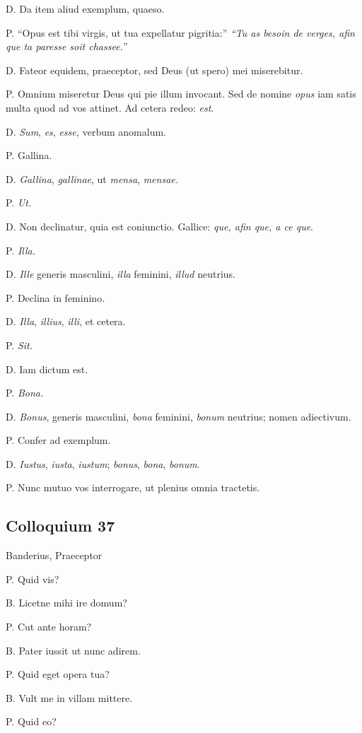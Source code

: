 \documentclass{article}
\begin{document}
D. Da item aliud exemplum, quaeso.

P. ``Opus est tibi virgis, ut tua expellatur pigritia:'' \emph{``Tu as besoin de verges, afin que ta paresse soit chassee.''}

D. Fateor equidem, praeceptor, sed Deus (ut spero) mei miserebitur.

P. Omnium miseretur Deus qui pie illum invocant. Sed de nomine \emph{opus} iam satis multa quod ad vos attinet. Ad cetera redeo: \emph{est}.

D. \emph{Sum}, \emph{es}, \emph{esse,} verbum anomalum.

P. {Gallina.}

D. \emph{Gallina}, \emph{gallinae}, ut \emph{mensa}, \emph{mensae.}

P. \emph{Ut.}

D. Non declinatur, quia est coniunctio. Gallice: \emph{que, afin que, a ce que}.

P. \emph{Illa.}

D. \emph{Ille} generis masculini, \emph{illa} feminini, \emph{illud} neutrius.

P. Declina in feminino.

D. \emph{Illa}, \emph{illius}, \emph{illi}, et cetera.

P. \emph{Sit.}

D. Iam dictum est.

P. \emph{Bona.}

D. \emph{Bonus}, generis masculini, \emph{bona} feminini, \emph{bonum} neutrius; nomen adiectivum.

P. Confer ad exemplum.

D. \emph{Iustus}, \emph{iusta}, \emph{iustum}; \emph{bonus}, \emph{bona}, \emph{bonum}.

P. Nunc mutuo vos interrogare, ut plenius omnia tractetis.

\subsection{Colloquium 37}
Banderius, Praeceptor

P. Quid vis?

B. Licetne mihi ire domum?

P. Cut ante horam?

B. Pater iussit ut nunc adirem.

P. Quid eget opera tua?

B. Vult me in villam mittere.

P. Quid eo?
\end{document}
